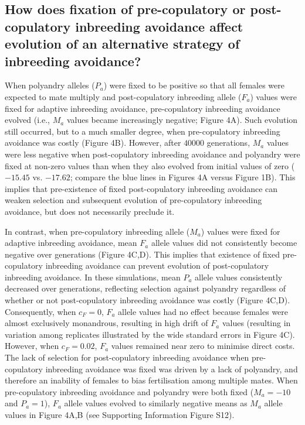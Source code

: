 \documentclass[10pt,letterpaper]{article}
\begin{document}
\subsection*{How does fixation of pre-copulatory or post-copulatory inbreeding avoidance affect evolution of an alternative strategy of inbreeding avoidance?}

When polyandry alleles ($P_{a}$) were fixed to be positive so that all females were expected to mate multiply and post-copulatory inbreeding allele ($F_{a}$) values were fixed for adaptive inbreeding avoidance, pre-copulatory inbreeding avoidance evolved (i.e., $M_{a}$ values became increasingly negative; Figure 4A). Such evolution still occurred, but to a much smaller degree, when pre-copulatory inbreeding avoidance was costly (Figure 4B). However, after $40000$ generations, $M_{a}$ values were less negative when post-copulatory inbreeding avoidance and polyandry were fixed at non-zero values than when they also evolved from initial values of zero ($-15.45$ vs. $-17.62$; compare the blue lines in Figures 4A versus Figure 1B). This implies that pre-existence of fixed post-copulatory inbreeding avoidance can weaken selection and subsequent evolution of pre-copulatory inbreeding avoidance, but does not necessarily preclude it.

In contrast, when pre-copulatory inbreeding allele ($M_{a}$) values were fixed for adaptive inbreeding avoidance, mean $F_{a}$ allele values did not consistently become negative over generations (Figure 4C,D). This implies that existence of fixed pre-copulatory inbreeding avoidance can prevent evolution of post-copulatory inbreeding avoidance. In these simulations, mean $P_{a}$ allele values consistently decreased over generations, reflecting selection against polyandry regardless of whether or not post-copulatory inbreeding avoidance was costly (Figure 4C,D). Consequently, when $c_{F}=0$, $F_{a}$ allele values had no effect because females were almost exclusively monandrous, resulting in high drift of $F_{a}$ values (resulting in variation among replicates illustrated by the wide standard errors in Figure 4C). However, when $c_{F}=0.02$, $F_{a}$ values remained near zero to minimise direct costs. The lack of selection for post-copulatory inbreeding avoidance when pre-copulatory inbreeding avoidance was fixed was driven by a lack of polyandry, and therefore an inability of females to bias fertilisation among multiple mates. When pre-copulatory inbreeding avoidance and polyandry were both fixed ($M_{a}=-10$ and $P_{a}=1$), $F_{a}$ allele values evolved to similarly negative means as $M_{a}$ allele values in Figure 4A,B (see Supporting Information Figure S12). 
\end{document}
